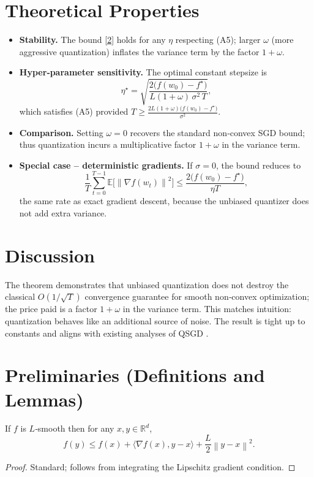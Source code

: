 \documentclass{article}
\newcommand{\E}{\mathbb{E}}
\newcommand{\R}{\mathbb{R}}
\newcommand{\norm}[1]{\left\lVert #1\right\rVert}
\newcommand{\ip}[2]{\langle #1,#2\rangle}
\newcommand{\grad}{\nabla}
\begin{document}
\section*{Theoretical Properties}
\begin{itemize}
\item \textbf{Stability.} The bound \eqref{2} holds for any $\eta$ respecting (A5); larger $\omega$ (more aggressive quantization) inflates the variance term by the factor $1+\omega$.
\item \textbf{Hyper‑parameter sensitivity.} The optimal constant stepsize is
\[
\eta^{\star}= \sqrt{\frac{2\big(f(w_0)-f^{\star}\big)}{L(1+\omega)\,\sigma^2\,T}} ,
\]
which satisfies (A5) provided $T\ge \frac{2L(1+\omega)\big(f(w_0)-f^{\star}\big)}{\sigma^2}$.
\item \textbf{Comparison.} Setting $\omega=0$ recovers the standard non‑convex SGD bound; thus quantization incurs a multiplicative factor $1+\omega$ in the variance term.
\item \textbf{Special case – deterministic gradients.} If $\sigma=0$, the bound reduces to
\[
\frac{1}{T}\sum_{t=0}^{T-1}\E\!\big[\norm{\grad f(w_t)}^2\big]
\le \frac{2\big(f(w_0)-f^{\star}\big)}{\eta T},
\]
the same rate as exact gradient descent, because the unbiased quantizer does not add extra variance.
\end{itemize}

\section*{Discussion}
The theorem demonstrates that unbiased quantization does not destroy the classical $O(1/\sqrt{T})$ convergence guarantee for smooth non‑convex optimization; the price paid is a factor $1+\omega$ in the variance term. This matches intuition: quantization behaves like an additional source of noise. The result is tight up to constants and aligns with existing analyses of QSGD \cite{Alistarh2017}.

\newpage
\section*{Preliminaries (Definitions and Lemmas)}
\begin{lemma}\label{lem:smooth}
If $f$ is $L$‑smooth then for any $x,y\in\R^d$,
\[
f(y)\le f(x)+\ip{\grad f(x)}{y-x}+\frac{L}{2}\norm{y-x}^2 .
\]
\end{lemma}
\begin{proof}
Standard; follows from integrating the Lipschitz gradient condition. \qedhere
\end{proof}
\end{document}
